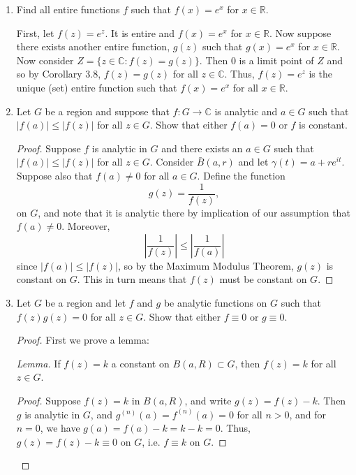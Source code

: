 \documentclass[11pt,oneside,english]{amsart}
\theoremstyle{definition}
\newcommand{\MB}[1]{\mathbb{#1}}
\begin{document}
\begin{enumerate}[leftmargin=*]
\item Find all entire functions $f$ such that $f(x)=e^x$ for $x\in\MB{R}$.

First, let $f(z)=e^z$. It is entire and $f(x)=e^x$ for $x\in \MB{R}$. Now suppose there exists another entire function, $g(z)$ such that $g(x)=e^x$ for $x\in\MB{R}$. Now consider $Z=\{z\in\MB{C}:f(z)=g(z)\}$. Then $0$ is a limit point of $Z$ and so by Corollary 3.8, $f(z)=g(z)$ for all $z\in \MB{C}$. Thus, $f(z)=e^z$ is the unique (set) entire function such that $f(x)=e^x$ for all $x\in \MB{R}$.



\setcounter{enumi}{5}

\item Let $G$ be a region and suppose that $f:G\to\MB{C}$ is analytic and $a\in G$ such that $|f(a)|\leq |f(z)|$ for all $z\in G$. Show that either $f(a)=0$ or $f$ is constant.

\begin{proof}
Suppose $f$ is analytic in $G$ and there exists an $a\in G$ such that $|f(a)|\leq |f(z)|$ for all $z\in G$. Consider $\bar B(a,r)$ and let $\gamma(t)=a+re^{it}$. Suppose also that $f(a)\neq0$ for all $a\in G$. Define the function
\[
g(z)=\frac{1}{f(z)},
\]
on $G$, and note that it is analytic there by implication of our assumption that $f(a)\neq 0$. Moreover, 
\[
\left|\frac{1}{f(z)}\right|\leq\left|\frac{1}{f(a)}\right|
\]
since $|f(a)|\leq |f(z)|$, so by the Maximum Modulus Theorem, $g(z)$ is constant on $G$. This in turn means that $f(z)$ must be constant on $G$.
\end{proof}


\setcounter{enumi}{7}

\item Let $G$ be a region and let $f$ and $g$ be analytic functions on $G$ such that $f(z)g(z)=0$ for all $z\in G$. Show that either $f\equiv 0$ or $g\equiv 0$.

\begin{proof}
First we prove a lemma:

\textit{Lemma.} If $f(z)=k$ a constant on $B(a,R)\subset G$, then $f(z)=k$ for all $z\in G$.

\begin{proof}
Suppose $f(z)=k$ in $B(a,R)$, and write $g(z)=f(z)-k$. Then $g$ is analytic in $G$, and $g^{(n)}(a)=f^{(n)}(a)=0$ for all $n>0$, and for $n=0$, we have $g(a)=f(a)-k=k-k=0$. Thus, $g(z)=f(z)-k\equiv 0$ on $G$, i.e. $f\equiv k$ on $G$.
\end{proof}


\end{proof}
\end{enumerate}
\end{document}
